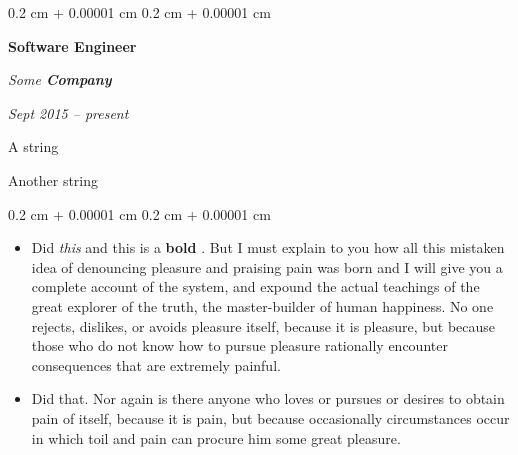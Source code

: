 \documentclass[10pt, letterpaper]{article}
\newenvironment{summary}{
    \begin{description}[
        topsep=0.10 cm,
        parsep=0.10 cm,
        partopsep=0pt,
        itemsep=0pt,
        leftmargin=0.4 cm + 10pt
    ]
}{
    \end{description}
} %
\newenvironment{highlights}{
    \begin{itemize}[
        topsep=0.10 cm,
        parsep=0.10 cm,
        partopsep=0pt,
        itemsep=0pt,
        leftmargin=0.4 cm + 10pt
    ]
}{
    \end{itemize}
} %
\newenvironment{onecolentry}{
    \begin{adjustwidth}{
        0.2 cm + 0.00001 cm
    }{
        0.2 cm + 0.00001 cm
    }
}{
    \end{adjustwidth}
} %
\newenvironment{twocolentry}[2][]{
    \onecolentry
    \def\secondColumn{#2}
    \setcolumnwidth{\fill, 4.5 cm}
    \begin{paracol}{2}
}{
    \switchcolumn \raggedleft \secondColumn
    \end{paracol}
    \endonecolentry
} %
\let\hrefWithoutArrow\href
\renewcommand{\href}[2]{\hrefWithoutArrow{#1}{\ifthenelse{\equal{#2}{}}{ }{#2 }\raisebox{.15ex}{\footnotesize \faExternalLink*}}}
\begin{document}
        \begin{twocolentry}{
            
            
        \textit{Sept 2015 – present}}
            \textbf{Software Engineer}
            
            \textit{Some \textbf{Company}}
        \end{twocolentry}
            \begin{summary}
                \item A string
                \item Another string
            \end{summary}
        \vspace{0.10 cm}
        \begin{onecolentry}
            \begin{highlights}
                \item Did \textit{this} and this is a \textbf{bold} \href{https://example.com}{link}. But I must explain to you how all this mistaken idea of denouncing pleasure and praising pain was born and I will give you a complete account of the system, and expound the actual teachings of the great explorer of the truth, the master-builder of human happiness. No one rejects, dislikes, or avoids pleasure itself, because it is pleasure, but because those who do not know how to pursue pleasure rationally encounter consequences that are extremely painful.
                \item Did that. Nor again is there anyone who loves or pursues or desires to obtain pain of itself, because it is pain, but because occasionally circumstances occur in which toil and pain can procure him some great pleasure.
            \end{highlights}
        \end{onecolentry}


        \vspace{0.2 cm}
\end{document}
